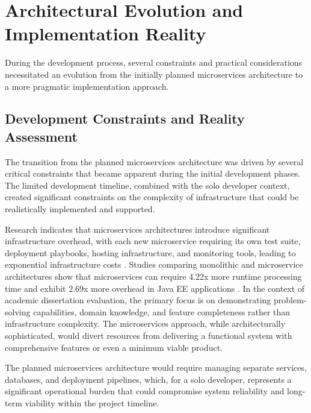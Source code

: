
\section{Architectural Evolution and Implementation Reality} \label{section:architectural_evolution}

During the development process, several constraints and practical considerations necessitated an evolution from the initially planned microservices architecture to a more pragmatic implementation approach.

\subsection{Development Constraints and Reality Assessment}

The transition from the planned microservices architecture was driven by several critical constraints that became apparent during the initial development phases. The limited development timeline, combined with the solo developer context, created significant constraints on the complexity of infrastructure that could be realistically implemented and supported.

Research indicates that microservices architectures introduce significant infrastructure overhead, with each new microservice requiring its own test suite, deployment playbooks, hosting infrastructure, and monitoring tools, leading to exponential infrastructure costs \cite{ServiceCostOverhead2023}. Studies comparing monolithic and microservice architectures show that microservices can require 4.22x more runtime processing time and exhibit 2.69x more overhead in Java EE applications \cite{MonolithicVsMicroservices2020}. In the context of academic dissertation evaluation, the primary focus is on demonstrating problem-solving capabilities, domain knowledge, and feature completeness rather than infrastructure complexity. The microservices approach, while architecturally sophisticated, would divert resources from delivering a functional system with comprehensive features or even a minimum viable product.

The planned microservices architecture would require managing separate services, databases, and deployment pipelines, which, for a solo developer, represents a significant operational burden that could compromise system reliability and long-term viability within the project timeline.


